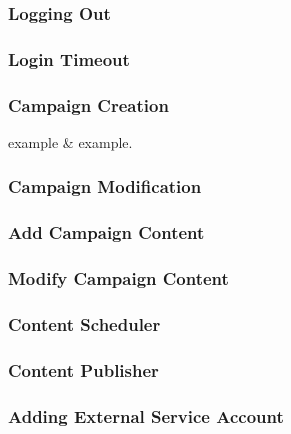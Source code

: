 \documentclass{article}
\newenvironment{testcase}
{
  \tabularx{\textwidth}{|p{1.5in}|X|}
  \hline 
  }{
    \hline
    \endtabularx
}
\begin{document}
\subsubsection{Logging Out} %
\subsubsection{Login Timeout} %
\subsubsection{Campaign Creation} %
\begin{testcase}
  example & example. \\
\end{testcase}
\subsubsection{Campaign Modification} %
\subsubsection{Add Campaign Content} %
\subsubsection{Modify Campaign Content} %
\subsubsection{Content Scheduler} %
\subsubsection{Content Publisher} %
\subsubsection{Adding External Service Account} %
\end{document}
